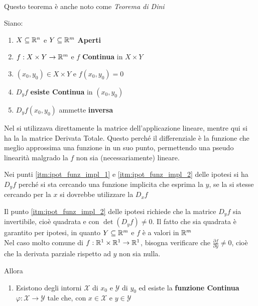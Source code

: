 \begin{theorem}~
	\label{teo:funz_impl}
	\vspace*{-\baselineskip}
	\begin{note}
		Questo teorema è anche noto come \textit{Teorema di Dini}
	\end{note} %
	Siano:
	\begin{enumerate}[noitemsep]
		\item $X \subseteq \mathbb{R}^n$ e $Y \subseteq \mathbb{R}^m$ \textbf{Aperti}
		\item $f: X \times Y \to \mathbb{R}^m$ e $f$ \textbf{Continua} in $X \times Y$
		\item $(x_0, y_0) \in X \times Y$ e $f(x_0, y_0) = 0$
		\item \label{itm:ipot_funz_impl_1} $D_yf$ \textbf{esiste Continua} in $(x_0, y_0)$
		\item \label{itm:ipot_funz_impl_2} $D_yf(x_0, y_0)$ ammette \textbf{inversa}
	\end{enumerate}
	\begin{note}
		\hypertarget{note:teo_funz_impl_note_ipot}{}
		Nel  si utilizzava direttamente la matrice dell'applicazione lineare, mentre qui si ha la la matrice Derivata Totale. Questo perché il differenziale è la funzione che meglio approssima una funzione in un suo punto, permettendo una pseudo linearità malgrado la $f$ non sia (necessariamente) lineare.
	\end{note}
	\begin{note}
		Nei punti \ref{itm:ipot_funz_impl_1} e \ref{itm:ipot_funz_impl_2} delle ipotesi si ha $D_yf$ perché si sta cercando una funzione implicita che esprima la $y$, se la si stesse cercando per la $x$ si dovrebbe utilizzare la $D_xf$
	\end{note}
	\begin{note}
		Il punto \ref{itm:ipot_funz_impl_2} delle ipotesi richiede che la matrice $D_yf$ sia invertibile, cioè quadrata e con $\det(D_yf) \neq 0$. Il fatto che sia quadrata è garantito per ipotesi, in quanto $Y \subseteq \mathbb{R}^m$ e $f$ è a valori in $\mathbb{R}^m$\\
		Nel caso molto comune di $f: \mathbb{R}^1 \times \mathbb{R}^1 \to \mathbb{R}^1$, bisogna verificare che $\frac{\partial f}{\partial y} \neq 0$, cioè che la derivata parziale rispetto ad $y$ non sia nulla.
	\end{note}
	Allora
	\begin{enumerate}
		\item Esistono degli intorni $\mathcal{X}$ di $x_0$ e $\mathcal{Y}$ di $y_0$ ed esiste la \textbf{funzione Continua} $\varphi: \mathcal{X} \to \mathcal{Y}$ tale che, con $x \in \mathcal{X}$ e $y \in \mathcal{Y}$

\end{enumerate}
\end{theorem}
